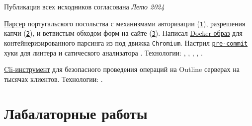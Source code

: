 \documentclass[margin,line]{resume}
\begin{document}
\begin{resume}
\begin{description}
\begin{list2}
        \vspace{2mm}

      \end{list2}
    \item[Дрегие проекты]\small{
        \begingroup
        \textcolor{gray!40}{Публикация всех исходников согласована}
        \endgroup
      }{\hfill
      \textsl{Лето 2024}}\vspace{2mm}
      \begin{list2}

      \item{
          \href{https://github.com/alchemmist/portu-hack}{Парсер}
          португальского посольства с механизмами авторизации
          (\href{https://github.com/alchemmist/portu-hack/blob/develop/parser/parser/searcher/auth.py}{\texttt{1}}),
          разрешения капчи
          (\href{https://github.com/alchemmist/portu-hack/blob/develop/parser/parser/searcher/captcha.py}{\texttt{2}}),
          и
          ветвистым обходом форм на сайте
          (\href{https://github.com/alchemmist/portu-hack/blob/develop/parser/parser/searcher/snif.py}{\texttt{3}}).
          Написал
          \href{https://github.com/alchemmist/portu-hack/blob/develop/parser/Dockerfile}{Docker
          образ} для контейнеризированного парсинга
           из под движка \texttt{Chromium}.
          Настрил
          \href{https://github.com/alchemmist/portu-hack/blob/develop/pre-commit-config.yaml}{\texttt{pre-commit}}
          хуки для линтера
           и сатического анализатора .
          Технологии: , ,
          ,
          ,
        .}

        \vspace{2mm}

      \item{
          \href{https://github.com/alchemmist/outline-vpn-cli}{Cli-инструмент}
          для безопасного проведения операций на
          Outline серверах на тысячах клиентов.
        Технологии: .}
      \end{list2}

  \end{description}

  \section{\mysidestyle Лабалаторные работы}\vspace{2mm}


\end{resume}
\end{document}
